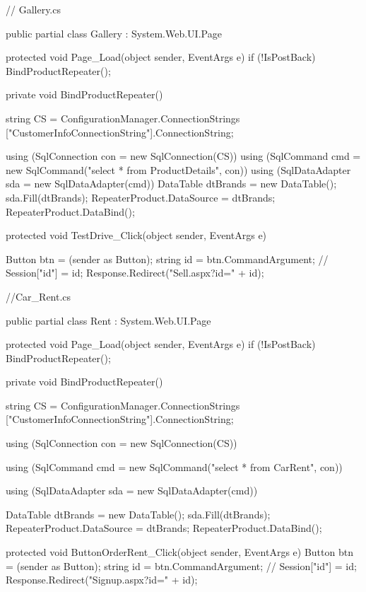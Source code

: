 \begin{spverbatim}
// Gallery.cs

public partial class Gallery : System.Web.UI.Page
{
    protected void Page_Load(object sender, EventArgs e)
    {
        if (!IsPostBack)
        {
            BindProductRepeater();
        }
    }

    private void BindProductRepeater()
    {
        string CS = ConfigurationManager.ConnectionStrings
["CustomerInfoConnectionString"].ConnectionString;

        using (SqlConnection con = new SqlConnection(CS))
        {
            using (SqlCommand cmd = new SqlCommand("select * from ProductDetails", con))
            {               
                using (SqlDataAdapter sda = new SqlDataAdapter(cmd))
                {
                    DataTable dtBrands = new DataTable();
                    sda.Fill(dtBrands);
                    RepeaterProduct.DataSource = dtBrands;
                    RepeaterProduct.DataBind();
                }
            }
        }
    }

    protected void TestDrive_Click(object sender, EventArgs e)
    {
        Button btn = (sender as Button);
        string id = btn.CommandArgument;
        // Session["id"] = id;
        Response.Redirect("Sell.aspx?id=" + id);
      
    }

}
\end{spverbatim}
\newpage

\begin{spverbatim}
//Car_Rent.cs

public partial class Rent : System.Web.UI.Page
{
    protected void Page_Load(object sender, EventArgs e)
    {
        if (!IsPostBack)
        {
            BindProductRepeater();
        }
    }

    private void BindProductRepeater()
    {
        string CS = ConfigurationManager.ConnectionStrings
["CustomerInfoConnectionString"].ConnectionString;

        using (SqlConnection con = new SqlConnection(CS))
        {
            using (SqlCommand cmd = new SqlCommand("select * from CarRent", con))
            {
                using (SqlDataAdapter sda = new SqlDataAdapter(cmd))
                {
                    DataTable dtBrands = new DataTable();
                    sda.Fill(dtBrands);
                    RepeaterProduct.DataSource = dtBrands;
                    RepeaterProduct.DataBind();

                }
            }
        }
    }

    protected void ButtonOrderRent_Click(object sender, EventArgs e)
    {
        Button btn = (sender as Button);
        string id = btn.CommandArgument;
        // Session["id"] = id;
        Response.Redirect("Signup.aspx?id=" + id);
    }
}
\end{spverbatim}
\newpage

